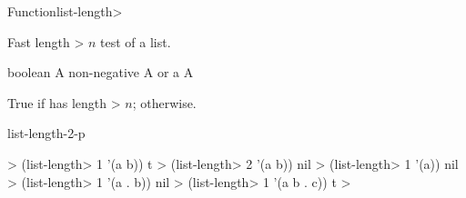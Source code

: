\documentclass[10pt,twoside,english,pdftex]{article}
\begin{document}

\begin{functiondoc}{Function}{list-length>}{%
    }
%
%

\fnsyntax

\fnpurpose Fast length > $n$ test of a list.

\fnpackage {}

\fnmodule {}

\fnargs
\begin{args}{boolean}
\arg[n] A non-negative 
\arg[list] A  or a 
\arg[boolean] A 
\end{args}

\fnreturns True if  has length > $n$; \nil{} otherwise.

\begin{alsos}{list-length-2-p}
\end{alsos}

\fnexamples
%
\W\supp
\begin{example}
  > (list-length> 1 '(a b))
  t
  > (list-length> 2 '(a b))
  nil
  > (list-length> 1 '(a))
  nil\goodpagebreak
  > (list-length> 1 '(a . b))
  nil
  > (list-length> 1 '(a b . c))
  t
  >
\end{example}

\end{functiondoc}

\end{document}
